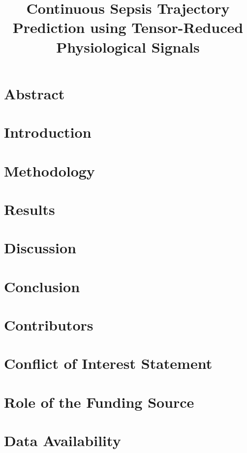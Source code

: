 \documentclass[a4paper,12pt]{article}
\title{Continuous Sepsis Trajectory Prediction using Tensor-Reduced Physiological Signals}
\date{}
\begin{document}
    \maketitle
    
    \clearpage
    
    \section*{Abstract} \label{sec:abstract}
    
    
    \section*{Introduction} \label{sec:intro}
    
    
    \section*{Methodology} \label{sec:methods}
    
    
    \section*{Results} \label{sec:results}
    
    
    \section*{Discussion} \label{sec:discussion}
    
    
    \section*{Conclusion} \label{sec:conclusion}
    
    
    \section*{Contributors}
    
    
    \section*{Conflict of Interest Statement}
    
    
    \section*{Role of the Funding Source}
    

    \section*{Data Availability}
    
    
    \printbibliography 
\end{document}
